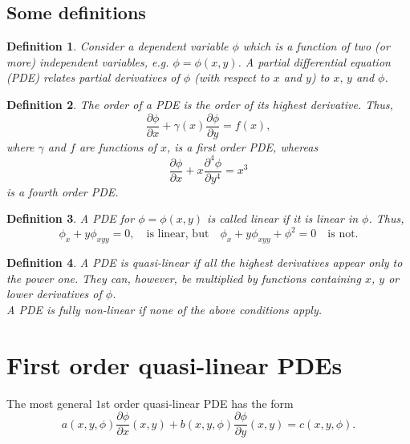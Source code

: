 \documentclass{article}
\newtheorem{definition}{Definition}
\begin{document}
\subsection{Some definitions}
\begin{definition}
    Consider a dependent variable $\phi$ which is a function of two (or more) independent variables, e.g. $\phi=\phi(x,y)$. A partial differential equation (PDE) relates partial derivatives of $\phi$ (with respect to $x$ and $y$) to $x,\,y$ and $\phi$.
\end{definition}
\begin{definition}
    The order of a PDE is the order of its highest derivative. Thus,
    \begin{equation}
        \frac{\partial \phi}{\partial x} + \gamma(x)\frac{\partial \phi}{\partial y} = f(x),
    \end{equation}
    where $\gamma$ and $f$ are functions of $x$, is a first order PDE, whereas
    \begin{equation}
        \frac{\partial \phi}{\partial x}+ x\frac{\partial^4 \phi}{\partial y^4} = x^3
    \end{equation}
    is a fourth order PDE.
\end{definition}
\begin{definition}
    A PDE for $\phi=\phi(x,y)$ is called linear if it is linear in $\phi$. Thus,
    \begin{equation}
        \phi_x + y\phi_{xyy} = 0,\quad\text{is linear, but}\quad \phi_x + y\phi_{xyy} + \phi^2 = 0\quad\text{is not.}
    \end{equation}
\end{definition}
\begin{definition}
    A PDE is quasi-linear if all the highest derivatives appear only to the power one. They can, however, be multiplied by functions containing $x$, $y$ or lower derivatives of $\phi$. \\
    A PDE is fully non-linear if none of the above conditions apply.
\end{definition}



\section{First order quasi-linear PDEs}
The most general $1$st order quasi-linear PDE has the form
\begin{equation}
    a(x,y,\phi)\frac{\partial \phi}{\partial x}(x,y) + b(x,y,\phi)\frac{\partial \phi}{\partial y}(x,y) = c(x,y,\phi). \label{eq:quasi_case1}
\end{equation}
\end{document}

